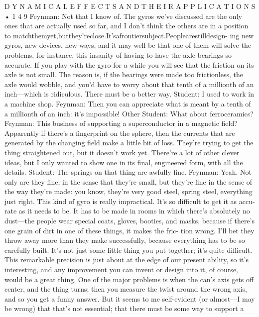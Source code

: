 \documentclass[10pt,oneside]{article}
\begin{document}
D Y N A M I C A L  E F F E C T S  A N D  T H E I R  A P P L I C A T I O N S • 1 4 9 Feynman: Not that I know of. The gyros we’ve discussed are the only ones that are actually used so far, and I don’t think the others are in a position to matchthemyet,butthey’reclose.It’safrontiersubject.Peoplearestilldesign- ing new gyros, new devices, new ways, and it may well be that one of them will solve the problems, for instance, this insanity of having to have the axle bearings so accurate. If you play with the gyro for a while you will see that the friction on its axle is not small. The reason is, if the bearings were made too frictionless, the axle would wobble, and you’d have to worry about that tenth of a millionth of an inch---which is ridiculous. There must be a better way. Student: I used to work in a machine shop. Feynman: Then you can appreciate what is meant by a tenth of a millionth of an inch: it’s impossible! Other Student: What about ferroceramics? Feynman: This business of supporting a superconductor in a magnetic field? Apparently if there’s a fingerprint on the sphere, then the currents that are generated by the changing field make a little bit of loss. They’re trying to get the thing straightened out, but it doesn’t work yet. There’re a lot of other clever ideas, but I only wanted to show one in its final, engineered form, with all the details. Student: The springs on that thing are awfully fine. Feynman: Yeah. Not only are they fine, in the sense that they’re small, but they’re fine in the sense of the way they’re made: you know, they’re very good steel, spring steel, everything just right. This kind of gyro is really impractical. It’s so difficult to get it as accu- rate as it needs to be. It has to be made in rooms in which there’s absolutely no dust---the people wear special coats, gloves, booties, and masks, because if there’s one grain of dirt in one of these things, it makes the fric- tion wrong. I’ll bet they throw away more than they make successfully, because everything has to be so carefully built. It’s not just some little thing you put together; it’s quite difficult. This remarkable precision is just about at the edge of our present ability, so it’s interesting, and any improvement you can invent or design into it, of course, would be a great thing. One of the major problems is when the can’s axis gets off center, and the thing turns; then you measure the twist around the wrong axis, and so you get a funny answer. But it seems to me self-evident (or almost---I may be wrong) that that’s not essential; that there must be some way to support a\par
\end{document}
